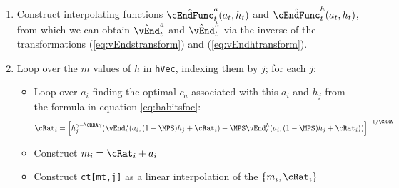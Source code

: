 \documentclass[titlepage]{\econtex}
\begin{document}
{\begin{enumerate}
Now at each of the $k$ locations in \texttt{ArgArray} calculate the
value of $\cEndFunc_{t}^{{a}}$ and $\cEndFunc_{t}^{h}$ (from
equations (\ref{eq:vEndsdefn}) and (\ref{eq:vEndhdefn})) and
\eqref{eq:vEndstransform} and \eqref{eq:vEndhtransform},
\begin{eqnarray}
        \cEndFunc_{k,t}^{{a}} & = & (h_{k}^{\ell})^{\gamma(1-1/\CRRA)}
\left(\Discount \Ex_{t}
    \left[
        \Rnorm_{t+1} (\hat{\vFunc}_{t+1}^{m}(\Rnorm_{t+1} s^{\ell}_{k} +
        {\tShkEmp}_{t+1},h^{\ell}_{k}))
    \right]
\right)^{-1/\CRRA}
\\      \cEndFunc_{k,t}^{h} & = &
\left(-(h_{k}^{\ell})^{1-\gamma(\CRRA-1)} \Discount \Ex_{t}
   \left[
         \hat{\vFunc}_{t+1}^{h}(\Rnorm_{t+1} s^{\ell}_{k} +
         {\tShkEmp}_{t+1},h^{\ell}_{k})
   \right]/\gamma
\right)^{1/(1-\CRRA)},
\end{eqnarray}
generating lists of values
$\cEndFunc^{a}_{k,t}$,$\cEndFunc^{h}_{k,t}$.

\item Construct interpolating functions $\hat{\cEndFunc}^{a}_{t}({a}_{t},h_{t})$
and $\hat{\cEndFunc}^{h}_{t}({a}_{t},h_{t})$, from which we can
obtain $\hat{\vEnd}^{a}_{t}$ and $\hat{\vEnd}^{h}_{t}$
via the inverse of the transformations (\ref{eq:vEndstransform})
and (\ref{eq:vEndhtransform}).

\item Loop over the $m$ values of $h$ in \texttt{hVec}, indexing them
by $j$; for each $j$:
\begin{itemize}
        \item Loop over ${a}_{i}$ finding the optimal ${c}_{a}$ associated
        with this ${a}_{i}$ and $h_{j}$ from the formula in equation
        \eqref{eq:habitsfoc}:
        \begin{equation}
                {\cRat}_{i} = \left[h_{j}^{\gamma-\CRRA \gamma}
                (\vEnd_{t}^{{a}}({a}_{i},(1-\MPS) h_{j}+ {\cRat}_{i})
                -\MPS \vEnd_{t}^{h}({a}_{i},(1-\MPS)
                h_{j}+{\cRat}_{i}))\right]^{-1/\CRRA} \nonumber
        \end{equation}

        \item Construct ${m}_{i} = {\cRat}_{i}+{a}_{i}$

        \item Construct \texttt{ct[mt,j]} as a linear interpolation of the
        $\{{m}_{i},{\cRat}_{i}\}$
\end{itemize}
\end{enumerate}

}
\end{document}
